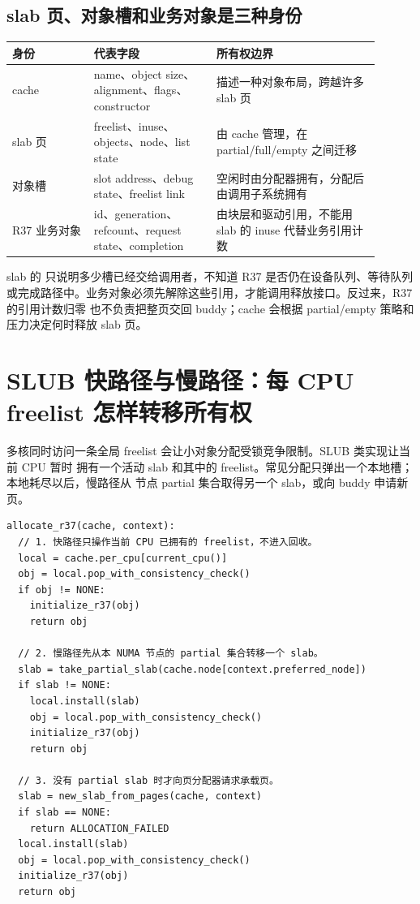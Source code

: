 \subsection{slab 页、对象槽和业务对象是三种身份}

\begin{longtable}{|L{0.2\linewidth}|L{0.3\linewidth}|L{0.4\linewidth}|}
\hline
身份 & 代表字段 & 所有权边界 \\ \hline
cache & name、object size、alignment、flags、constructor &
描述一种对象布局，跨越许多 slab 页 \\\tablerowrule
slab 页 & freelist、inuse、objects、node、list state &
由 cache 管理，在 partial/full/empty 之间迁移 \\\tablerowrule
对象槽 & slot address、debug state、freelist link &
空闲时由分配器拥有，分配后由调用子系统拥有 \\\tablerowrule
R37 业务对象 & id、generation、refcount、request state、completion &
由块层和驱动引用，不能用 slab 的 inuse 代替业务引用计数 \\
\hline
\end{longtable}

slab 的  只说明多少槽已经交给调用者，不知道 R37 是否仍在设备队列、等待队列
或完成路径中。业务对象必须先解除这些引用，才能调用释放接口。反过来，R37 的引用计数归零
也不负责把整页交回 buddy；cache 会根据 partial/empty 策略和压力决定何时释放 slab 页。

\section{SLUB 快路径与慢路径：每 CPU freelist 怎样转移所有权}

多核同时访问一条全局 freelist 会让小对象分配受锁竞争限制。SLUB 类实现让当前 CPU 暂时
拥有一个活动 slab 和其中的 freelist。常见分配只弹出一个本地槽；本地耗尽以后，慢路径从
节点 partial 集合取得另一个 slab，或向 buddy 申请新页。

\begin{lstlisting}
allocate_r37(cache, context):
  // 1. 快路径只操作当前 CPU 已拥有的 freelist，不进入回收。
  local = cache.per_cpu[current_cpu()]
  obj = local.pop_with_consistency_check()
  if obj != NONE:
    initialize_r37(obj)
    return obj

  // 2. 慢路径先从本 NUMA 节点的 partial 集合转移一个 slab。
  slab = take_partial_slab(cache.node[context.preferred_node])
  if slab != NONE:
    local.install(slab)
    obj = local.pop_with_consistency_check()
    initialize_r37(obj)
    return obj

  // 3. 没有 partial slab 时才向页分配器请求承载页。
  slab = new_slab_from_pages(cache, context)
  if slab == NONE:
    return ALLOCATION_FAILED
  local.install(slab)
  obj = local.pop_with_consistency_check()
  initialize_r37(obj)
  return obj
\end{lstlisting}

